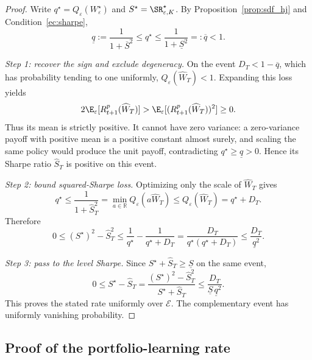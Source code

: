 \begin{proof}
Write $q^\star=Q_\varepsilon(W^\star_\varepsilon)$ and
$S^\star=\SR^\star_{\varepsilon,K}$. By
Proposition~\ref{prop:sdf_hj} and Condition~\ref{ec:sharpe},
\[
\underline q:=\frac1{1+\overline S^2}
\leq q^\star\leq
\frac1{1+\underline S^2}=: \overline q<1.
\]

\medskip
\noindent\textit{Step 1: recover the sign and exclude degeneracy.}
On the event $D_T<1-\overline q$, which has probability tending to one
uniformly, $Q_\varepsilon(\widehat W_T)<1$. Expanding this loss yields
\[
2\E_\varepsilon[R^p_{t+1}(\widehat W_T)]
>
\E_\varepsilon[(R^p_{t+1}(\widehat W_T))^2]\geq0.
\]
Thus its mean is strictly positive. It cannot have zero variance: a zero-variance payoff with positive mean is a positive constant almost surely, and scaling the same policy would produce the unit payoff, contradicting $q^\star\geq\underline q>0$. Hence its Sharpe ratio
$\widehat S_T$ is positive on this event.

\medskip
\noindent\textit{Step 2: bound squared-Sharpe loss.}
Optimizing only the scale of $\widehat W_T$ gives
\[
q^\star
\leq\frac1{1+\widehat S_T^2}
=\min_{a\in\mathbb R}Q_\varepsilon(a\widehat W_T)
\leq Q_\varepsilon(\widehat W_T)
=q^\star+D_T.
\]
Therefore
\[
0\leq(S^\star)^2-\widehat S_T^2
\leq\frac1{q^\star}-\frac1{q^\star+D_T}
=\frac{D_T}{q^\star(q^\star+D_T)}
\leq\frac{D_T}{\underline q^2}.
\]

\medskip
\noindent\textit{Step 3: pass to the level Sharpe.}
Since $S^\star+\widehat S_T\geq\underline S$ on the same event,
\[
0\leq S^\star-\widehat S_T
=\frac{(S^\star)^2-\widehat S_T^2}{S^\star+\widehat S_T}
\leq\frac{D_T}{\underline S\,\underline q^2}.
\]
This proves the stated rate uniformly over $\mathcal E$. The complementary event has uniformly vanishing probability.
\end{proof}

\subsection{Proof of the portfolio-learning rate}
\label{app:rate}


